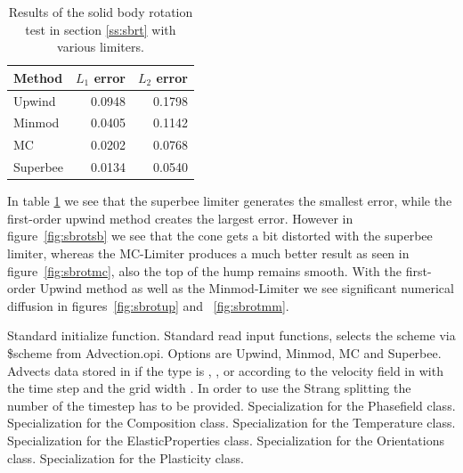 \begin{table}
\centering
\begin{tabular}{l|r|r}
Method & $L_1$ error & $L_2$ error \\
\hline
Upwind & 0.0948 & 0.1798 \\
Minmod & 0.0405 & 0.1142 \\
MC & 0.0202 &  0.0768 \\
Superbee & 0.0134 &  0.0540
\end{tabular}
\caption{Results of the solid body rotation test in section \ref{ss:sbrt} with various limiters.}
\label{tab:sbrt}
\end{table}
In table \ref{tab:sbrt} we see that the superbee limiter generates the smallest error, while the first-order upwind method creates the largest error. However in figure~\ref{fig:sbrotsb} we see that the cone gets a bit distorted with the superbee limiter, whereas the MC-Limiter produces a much better result as seen in figure~\ref{fig:sbrotmc}, also the top of the hump remains smooth. With the first-order Upwind method as well as the Minmod-Limiter we see significant numerical diffusion in figures~\ref{fig:sbrotup} and ~\ref{fig:sbrotmm}.

\begin{description}[font=\sffamily, font=\normalsize]
   Standard initialize function.
   Standard read input functions, selects the scheme via \$scheme from Advection.opi. Options are Upwind, Minmod, MC and Superbee.
   Advects data stored in  if the type  is , ,  or  according to the velocity field in  with the time step  and the grid width . In order to use the Strang splitting the number of the timestep   has to be provided.
   Specialization for the Phasefield class.
   Specialization for the Composition class.
   Specialization for the Temperature class.
   Specialization for the ElasticProperties class.
   Specialization for the Orientations class.
   Specialization for the Plasticity class.
\end{description}

